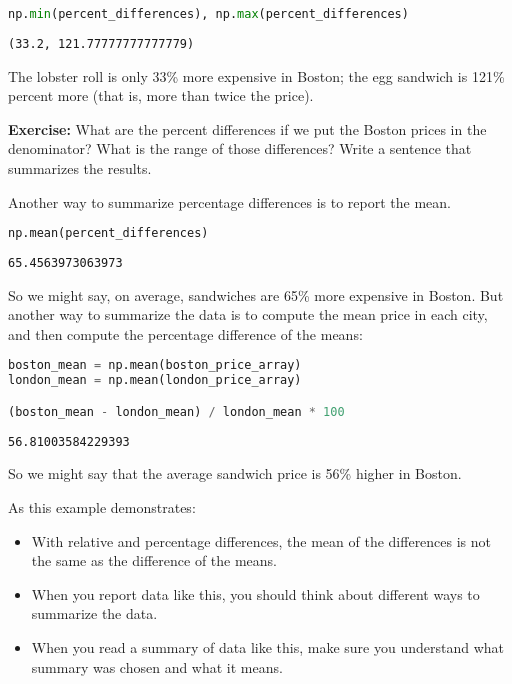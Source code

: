 \begin{lstlisting}[language=Python]
np.min(percent_differences), np.max(percent_differences)
\end{lstlisting}

\begin{lstlisting}[]
(33.2, 121.77777777777779)
\end{lstlisting}

The lobster roll is only 33\% more expensive in Boston; the egg sandwich
is 121\% percent more (that is, more than twice the price).

\textbf{Exercise:} What are the percent differences if we put the Boston
prices in the denominator? What is the range of those differences? Write
a sentence that summarizes the results.

Another way to summarize percentage differences is to report the mean.

\begin{lstlisting}[language=Python]
np.mean(percent_differences)
\end{lstlisting}

\begin{lstlisting}[]
65.4563973063973
\end{lstlisting}

So we might say, on average, sandwiches are 65\% more expensive in
Boston. But another way to summarize the data is to compute the mean
price in each city, and then compute the percentage difference of the
means:

\begin{lstlisting}[language=Python]
boston_mean = np.mean(boston_price_array)
london_mean = np.mean(london_price_array)

(boston_mean - london_mean) / london_mean * 100
\end{lstlisting}

\begin{lstlisting}[]
56.81003584229393
\end{lstlisting}

So we might say that the average sandwich price is 56\% higher in
Boston.

As this example demonstrates:

\begin{itemize}
\item
  With relative and percentage differences, the mean of the differences
  is not the same as the difference of the means.
\item
  When you report data like this, you should think about different ways
  to summarize the data.
\item
  When you read a summary of data like this, make sure you understand
  what summary was chosen and what it means.
\end{itemize}

